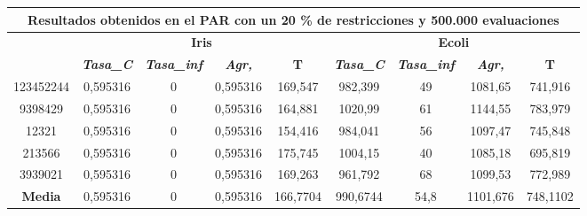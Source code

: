 \documentclass[12pt, spanish]{article}
\begin{document}
\begin{table}[H]
\begin{tabular}{|c|c|c|c|c|c|c|c|c|}
\hline
\multicolumn{9}{|c|}{\textbf{Resultados obtenidos en el PAR con un 20 \% de restricciones y 500.000 evaluaciones}}                                                                                                \\ \hline
\multirow{2}{*}{} & \multicolumn{4}{c|}{\textbf{Iris}}                                                            & \multicolumn{4}{c|}{\textbf{Ecoli}}                                                           \\ \cline{2-9} 
                  & \textit{\textbf{Tasa\_C}} & \textit{\textbf{Tasa\_inf}} & \textit{\textbf{Agr,}} & \textbf{T} & \textit{\textbf{Tasa\_C}} & \textit{\textbf{Tasa\_inf}} & \textit{\textbf{Agr,}} & \textbf{T} \\ \hline
123452244         & 0,595316                  & 0                           & 0,595316               & 169,547    & 982,399                   & 49                          & 1081,65                & 741,916    \\ \hline
9398429           & 0,595316                  & 0                           & 0,595316               & 164,881    & 1020,99                   & 61                          & 1144,55                & 783,979    \\ \hline
12321             & 0,595316                  & 0                           & 0,595316               & 154,416    & 984,041                   & 56                          & 1097,47                & 745,848    \\ \hline
213566            & 0,595316                  & 0                           & 0,595316               & 175,745    & 1004,15                   & 40                          & 1085,18                & 695,819    \\ \hline
3939021           & 0,595316                  & 0                           & 0,595316               & 169,263    & 961,792                   & 68                          & 1099,53                & 772,989    \\ \hline
\textbf{Media}    & 0,595316                  & 0                           & 0,595316               & 166,7704   & 990,6744                  & 54,8                        & 1101,676               & 748,1102   \\ \hline
\end{tabular}
\end{table}
\end{document}
